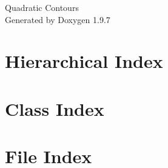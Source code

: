 \documentclass[twoside]{book}
\newcommand{\+}{\discretionary{\mbox{\scriptsize$\hookleftarrow$}}{}{}}
\newcommand{\clearemptydoublepage}{%
    \newpage{\pagestyle{empty}\cleardoublepage}%
  }
\begin{document}
  \raggedbottom
    \hypersetup{pageanchor=false,
                bookmarksnumbered=true,
                pdfencoding=unicode
               }
  \begin{titlepage}
  \vspace*{7cm}
  \begin{center}%
  {\Large Quadratic Contours}\\
  \vspace*{1cm}
  {\large Generated by Doxygen 1.9.7}\\
  \end{center}
  \end{titlepage}
  \clearemptydoublepage
  \tableofcontents
  \clearemptydoublepage
  \hypersetup{pageanchor=true}



\chapter{Hierarchical Index}

\chapter{Class Index}

\chapter{File Index}

\end{document}
